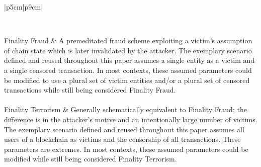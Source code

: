 \documentclass[11pt]{article}
\theoremstyle{plain}
\begin{document}
\begin{table}[H]
\caption{Abstracts of Referenced Chain State Scenarios \label{table: chainstate-scenarios}}
\centering
\small{
\begin{tabular}{|p{5cm}|p{9cm}|}

\hline
{} \\
\hline
\hline

Finality Fraud & A premeditated fraud scheme exploiting a victim's
assumption of chain state which is later invalidated by the attacker.
The exemplary scenario defined and reused throughout this paper assumes a single
entity as a victim and a single censored transaction.
In most contexts, these assumed parameters could be modified to use a plural set of victim entities
and/or a plural set of censored transactions while still being considered Finality Fraud.
\\~\\

Finality Terrorism & Generally schematically equivalent to Finality
Fraud; the difference is in the attacker's motive and an intentionally large number of victims.
The exemplary scenario defined and reused throughout this paper
assumes all users of a blockchain as victims and the censorship of all transactions.
These parameters are extremes.
In most contexts, these assumed parameters could be modified while still being considered Finality Terrorism.
\\~\\

\hline
\end{tabular}
}
\end{table}




\end{document}
